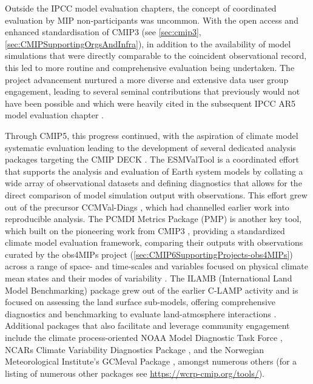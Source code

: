 \documentclass[manuscript]{copernicus}
\begin{document}
Outside the IPCC model evaluation chapters, the concept of coordinated evaluation by MIP non-participants was uncommon. With the open access and enhanced standardisation of CMIP3 (see \autoref{sec:cmip3}, \autoref{sec:CMIPSupportingOrgsAndInfra}), in addition to the availability of model simulations that were directly comparable to the coincident observational record, this led to more routine and comprehensive evaluation being undertaken. The project advancement nurtured a more diverse and extensive data user group engagement, leading to several seminal contributions that previously would not have been possible \citep[e.g.,][]{eyring_assessment_2006,gleckler_performance_2008,waugh_quantitative_2008} and which were heavily cited in the subsequent IPCC AR5 model evaluation chapter \citep{flato_evaluation_2013}.

Through CMIP5, this progress continued, with the aspiration of climate model systematic evaluation leading to the development of several dedicated analysis packages targeting the CMIP DECK \citep{eyring_towards_2016}. The ESMValTool \citep[Earth System Model Evaluation Tool;][]{eyring_esmvaltool_2016,righi_earth_2020,eyring_earth_2020} is a coordinated effort that supports the analysis and evaluation of Earth system models by collating a wide array of observational datasets and defining diagnostics that allows for the direct comparison of model simulation output with observations. This effort grew out of the precursor CCMVal-Diags \citep[Chemistry-Climate Model Validation Diagnostic tool;][]{gettelman_community_2012}, which had channelled earlier work \citep{eyring_assessment_2006,waugh_quantitative_2008} into reproducible analysis. The PCMDI Metrics Package (PMP) is another key tool, which built on the pioneering work from CMIP3 \citep{gleckler_performance_2008}, providing a standardized climate model evaluation framework, comparing their outputs with observations curated by the obs4MIPs project (\autoref{sec:CMIP6SupportingProjects-obs4MIPs}) across a range of space- and time-scales and variables focused on physical climate mean states and their modes of variability \citep{gleckler_more_2016,lee_systematic_2024}. The ILAMB (International Land Model Benchmarking) package grew out of the earlier C-LAMP activity \citep{hoffman_results_2007} and is focused on assessing the land surface sub-models, offering comprehensive diagnostics and benchmarking to evaluate land-atmosphere interactions \citep{collier_international_2018}. Additional packages that also facilitate and leverage community engagement include the climate process-oriented NOAA Model Diagnostic Task Force \citep[NOAA-MDTF;][]{neelin_process-oriented_2023}, NCARs Climate Variability Diagnostics Package \citep[CVDP;][]{phillips_evaluating_2014}, and the Norwegian Meteorological Institute's GCMeval Package \citep{parding_gcmeval_2020}, amongst numerous others (for a listing of numerous other packages see \url{https://wcrp-cmip.org/tools/}).
\end{document}
